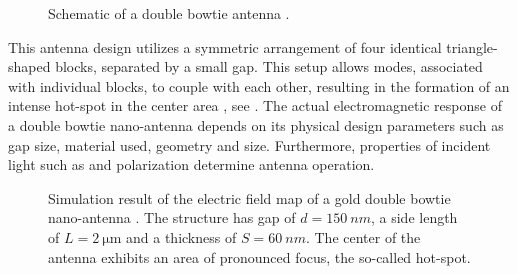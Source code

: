 		\begin{figure}[thp]
				\centering
				\caption[Schematic of a double bowtie antenna]{Schematic of a double bowtie antenna \cite{rahbany2016towards, Rahbany2015, rahbany2016towards}.}
				\label{fig::double_bowtie_antenna_schematic}
		\end{figure}

		This antenna design utilizes a symmetric arrangement of four identical triangle-shaped blocks, separated by a small gap. This setup allows \LSP modes, associated with individual blocks, to couple with each other, resulting in the formation of an intense hot-spot in the center area \cite{ghenuche2008spectroscopic}, see . The actual electromagnetic response of a double bowtie nano-antenna depends on its physical design parameters such as gap size, material used, geometry and size. Furthermore, properties of incident light such as \wl and polarization determine antenna operation.

		\begin{figure}[thp]
				\centering
				\caption[Hot-spot of a double bowtie antenna]{Simulation result of the electric field map of a gold double bowtie nano-antenna \cite{rahbany2016towards, Rahbany2015, rahbany2016towards}. The structure has gap of $d = \SI{150}{nm}$, a side length of $L = \SI{2}{\micro\meter}$ and a thickness of $S = \SI{60}{nm}$. The center of the antenna exhibits an area of pronounced focus, the so-called hot-spot.}
				\label{fig::double_bow_tie_hotspot}
		\end{figure}


